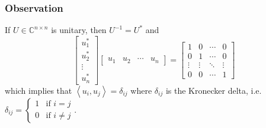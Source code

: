 \documentclass[11pt]{article}
\newcommand{\inner}[2]{\left\langle #1, #2 \right\rangle}
\begin{document}
\subsubsection*{Observation}
If $U \in \mathbb{C}^{n \times n}$ is unitary, then $U^{-1} = U^*$ and 
\[\begin{bmatrix}
    u_1^* \\
    u_2^* \\
    \vdots \\
    u_n^*
\end{bmatrix} \begin{bmatrix}
    u_1 & u_2 & \cdots & u_n
\end{bmatrix} = \begin{bmatrix}
    1 & 0 & \cdots & 0 \\
    0 & 1 & \cdots & 0 \\
    \vdots & \vdots & \ddots & \vdots \\
    0 & 0 & \cdots & 1
\end{bmatrix}
\] 
which implies that $\inner{u_i}{u_j} = \delta_{ij}$ where $\delta_{ij}$ is the Kronecker delta, i.e. $\delta_{ij} = \begin{cases}
1 & \text{if } i = j \\
0 & \text{if } i \neq j
\end{cases}$.
\end{document}
